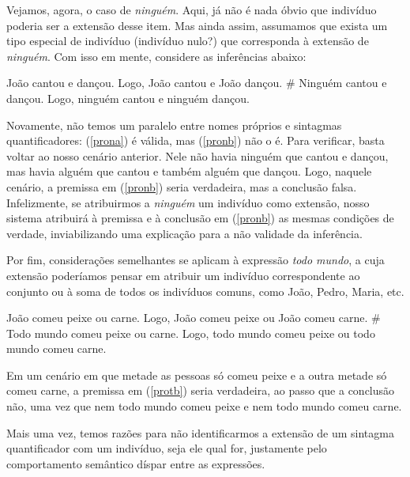 Vejamos, agora, o caso de \textit{ninguém}. Aqui, já não é nada óbvio que
indivíduo poderia ser a extensão desse item. Mas ainda assim,
assumamos que exista um tipo especial de indivíduo (indivíduo
nulo?) que corresponda à extensão de \textit{ninguém}. Com isso em mente,
considere as inferências abaixo:

\begin{exe}
\ex\label{pron}
\begin{xlist}
\ex João cantou e dançou. Logo, João cantou e João dançou.\label{prona}
\ex \# Ninguém cantou e dançou. Logo, ninguém cantou e ninguém dançou.\label{pronb}
\end{xlist}
\end{exe}

\n Novamente, não temos um paralelo entre nomes próprios e
sintagmas quantificadores: (\ref{prona}) é válida, mas
(\ref{pronb}) não o é. Para verificar, basta voltar ao nosso
cenário anterior. Nele não havia ninguém que cantou e dançou, mas
havia alguém que cantou e também alguém que dançou. Logo, naquele
cenário, a premissa em (\ref{pronb}) seria verdadeira, mas a
conclusão falsa. Infelizmente, se atribuirmos a \textit{ninguém} um
indivíduo como extensão, nosso sistema atribuirá à premissa e à
conclusão em (\ref{pronb}) as mesmas condições de verdade,
inviabilizando uma explicação para a não validade da
inferência.

Por fim, considerações semelhantes se aplicam à expressão \textit{todo
mundo}, a cuja extensão poderíamos pensar em atribuir um indivíduo
correspondente ao conjunto ou à soma de todos os indivíduos
comuns, como João, Pedro, Maria, etc.

\begin{exe}
\ex\label{prot}
\begin{xlist}
\ex João comeu peixe ou carne. Logo, João comeu peixe ou João comeu carne.\label{prota}
\ex \# Todo mundo comeu peixe ou carne. Logo, todo mundo comeu peixe ou todo mundo comeu carne.\label{protb}
\end{xlist}
\end{exe}

\n Em um cenário em que metade as pessoas só comeu peixe e a outra metade só comeu carne, a premissa em (\ref{protb}) seria verdadeira, ao passo que a conclusão não, uma vez que nem todo mundo comeu peixe e nem todo mundo comeu carne.

Mais uma vez, temos razões para não identificarmos a extensão de
um sintagma quantificador com um indivíduo, seja ele qual for, justamente pelo comportamento semântico díspar entre as expressões.

